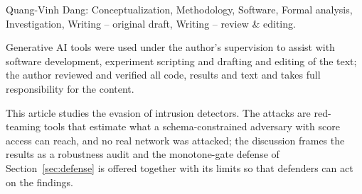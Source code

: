\documentclass[pdflatex,sn-basic,Numbered]{sn-jnl}%
\theoremstyle{thmstyleone}
\theoremstyle{thmstyletwo}
\theoremstyle{thmstylethree}
\begin{document}
Quang-Vinh Dang: Conceptualization, Methodology, Software, Formal analysis, Investigation, Writing -- original draft, Writing -- review \& editing.

Generative AI tools were used under the author's supervision to assist with software development, experiment scripting and drafting and editing of the text; the author reviewed and verified all code, results and text and takes full responsibility for the content.

This article studies the evasion of intrusion detectors. The attacks are red-teaming tools that estimate what a schema-constrained adversary with score access can reach, and no real network was attacked; the discussion frames the results as a robustness audit and the monotone-gate defense of Section~\ref{sec:defense} is offered together with its limits so that defenders can act on the findings.


\end{document}
